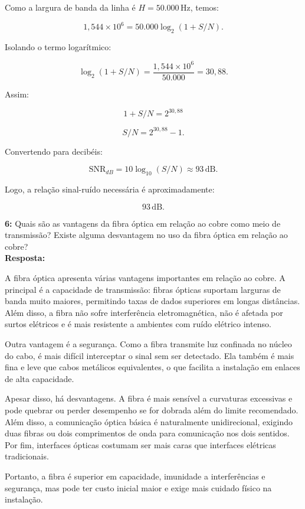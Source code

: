 \documentclass[12pt,a4paper]{report}
\begin{document}
Como a largura de banda da linha é $H = 50.000\,\text{Hz}$, temos:

\[
1{,}544 \times 10^6 = 50.000\log_2(1+S/N).
\]

Isolando o termo logarítmico:

\[
\log_2(1+S/N) = \frac{1{,}544 \times 10^6}{50.000} = 30{,}88.
\]

Assim:

\[
1+S/N = 2^{30{,}88}
\]

\[
S/N = 2^{30{,}88}-1.
\]

Convertendo para decibéis:

\[
\text{SNR}_{dB} = 10\log_{10}(S/N) \approx 93\,\text{dB}.
\]

Logo, a relação sinal-ruído necessária é aproximadamente:

\[
\boxed{93\,\text{dB}}.
\]


\vspace{0.6cm}

\noindent \textbf{6:} Quais são as vantagens da fibra óptica em relação ao cobre como meio de transmissão? Existe alguma desvantagem no uso da fibra óptica em relação ao cobre?\\
\textbf{Resposta:}

A fibra óptica apresenta várias vantagens importantes em relação ao cobre. A principal é a capacidade de transmissão: fibras ópticas suportam larguras de banda muito maiores, permitindo taxas de dados superiores em longas distâncias. Além disso, a fibra não sofre interferência eletromagnética, não é afetada por surtos elétricos e é mais resistente a ambientes com ruído elétrico intenso.

Outra vantagem é a segurança. Como a fibra transmite luz confinada no núcleo do cabo, é mais difícil interceptar o sinal sem ser detectado. Ela também é mais fina e leve que cabos metálicos equivalentes, o que facilita a instalação em enlaces de alta capacidade.

Apesar disso, há desvantagens. A fibra é mais sensível a curvaturas excessivas e pode quebrar ou perder desempenho se for dobrada além do limite recomendado. Além disso, a comunicação óptica básica é naturalmente unidirecional, exigindo duas fibras ou dois comprimentos de onda para comunicação nos dois sentidos. Por fim, interfaces ópticas costumam ser mais caras que interfaces elétricas tradicionais.

Portanto, a fibra é superior em capacidade, imunidade a interferências e segurança, mas pode ter custo inicial maior e exige mais cuidado físico na instalação.
\end{document}
